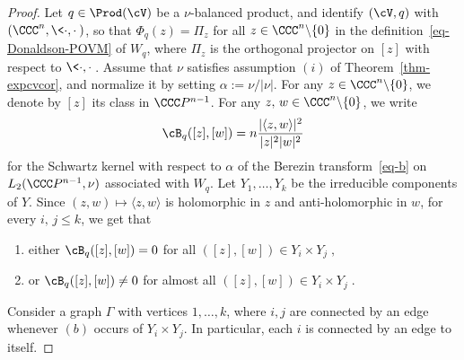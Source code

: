 \begin{proof}
Let $q\in\Prod(\cV)$ be a $\nu$-balanced product, and identify $(\cV,q)$ with $(\CCC^n,\<\cdot,\cdot\>)$, so that $\Phi_q(z)=\Pi_z$ for all $z\in\CCC^n\backslash\{0\}$ in the definition~\eqref{eq-Donaldson-POVM} of $W_q$, where $\Pi_z$ is the orthogonal projector on $[z]$ with respect to $\<\cdot,\cdot\>$. Assume that $\nu$ satisfies assumption $(i)$ of Theorem~\ref{thm-expcvcor}, and normalize it by setting $\alpha:= \nu/|\nu|$. For any $z\in\CCC^n\backslash\{0\}$, we denote by $[z]$ its class in $\CCC P^{n-1}$. For any $z,\,w\in\CCC^n\backslash\{0\}$, we write
\begin{equation}
\cB_q([z],[w])= n\frac{|\langle z, w \rangle |^2} {|z|^2|w|^2}
\end{equation}
for the Schwartz kernel with respect to $\alpha$ of the Berezin transform~\eqref{eq-b} on\linebreak $L_2(\CCC P^{n-1},\nu)$ associated with $W_q$. Let $Y_1,\dots, Y_k$ be the irreducible components of $Y$. Since $(z,w) \mapsto \langle z, w\rangle$ is holomorphic in $z$ and anti-holomorphic in $w$, for every $i,\,j\leq k$, we get that
\begin{enumerate}\alphenumi
\item either $\cB_q([z],[w]) = 0$ for all $([z],[w])\in Y_i \times Y_j\;,$
\item or $\cB_q([z],[w])\neq 0$ for almost all $([z],[w])\in Y_i \times Y_j\;.$
\end{enumerate}
Consider a graph $\Gamma$ with vertices $1,\dots, k$, where $i,j$ are connected by an edge whenever $(b)$ occurs of $Y_i\times Y_j$. In particular, each $i$ is connected by an edge to itself.



\end{proof}
